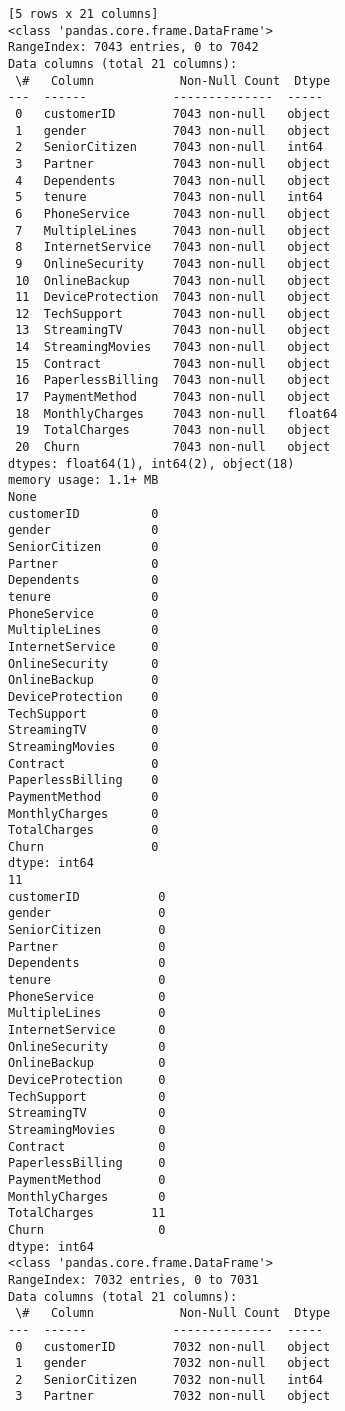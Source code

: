\documentclass[11pt]{article}
\begin{document}
\begin{Verbatim}[commandchars=\\\{\}]
[5 rows x 21 columns]
<class 'pandas.core.frame.DataFrame'>
RangeIndex: 7043 entries, 0 to 7042
Data columns (total 21 columns):
 \#   Column            Non-Null Count  Dtype
---  ------            --------------  -----
 0   customerID        7043 non-null   object
 1   gender            7043 non-null   object
 2   SeniorCitizen     7043 non-null   int64
 3   Partner           7043 non-null   object
 4   Dependents        7043 non-null   object
 5   tenure            7043 non-null   int64
 6   PhoneService      7043 non-null   object
 7   MultipleLines     7043 non-null   object
 8   InternetService   7043 non-null   object
 9   OnlineSecurity    7043 non-null   object
 10  OnlineBackup      7043 non-null   object
 11  DeviceProtection  7043 non-null   object
 12  TechSupport       7043 non-null   object
 13  StreamingTV       7043 non-null   object
 14  StreamingMovies   7043 non-null   object
 15  Contract          7043 non-null   object
 16  PaperlessBilling  7043 non-null   object
 17  PaymentMethod     7043 non-null   object
 18  MonthlyCharges    7043 non-null   float64
 19  TotalCharges      7043 non-null   object
 20  Churn             7043 non-null   object
dtypes: float64(1), int64(2), object(18)
memory usage: 1.1+ MB
None
customerID          0
gender              0
SeniorCitizen       0
Partner             0
Dependents          0
tenure              0
PhoneService        0
MultipleLines       0
InternetService     0
OnlineSecurity      0
OnlineBackup        0
DeviceProtection    0
TechSupport         0
StreamingTV         0
StreamingMovies     0
Contract            0
PaperlessBilling    0
PaymentMethod       0
MonthlyCharges      0
TotalCharges        0
Churn               0
dtype: int64
11
customerID           0
gender               0
SeniorCitizen        0
Partner              0
Dependents           0
tenure               0
PhoneService         0
MultipleLines        0
InternetService      0
OnlineSecurity       0
OnlineBackup         0
DeviceProtection     0
TechSupport          0
StreamingTV          0
StreamingMovies      0
Contract             0
PaperlessBilling     0
PaymentMethod        0
MonthlyCharges       0
TotalCharges        11
Churn                0
dtype: int64
<class 'pandas.core.frame.DataFrame'>
RangeIndex: 7032 entries, 0 to 7031
Data columns (total 21 columns):
 \#   Column            Non-Null Count  Dtype
---  ------            --------------  -----
 0   customerID        7032 non-null   object
 1   gender            7032 non-null   object
 2   SeniorCitizen     7032 non-null   int64
 3   Partner           7032 non-null   object

\end{Verbatim}
\end{document}
